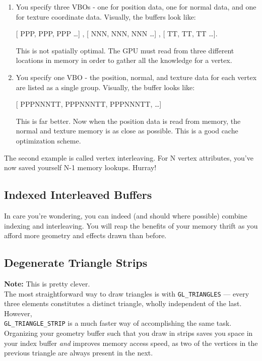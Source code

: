 \documentclass{scrartcl}
\begin{document}
\begin{enumerate}

\item You specify three VBOs - one for position data, one for normal data, and one for texture coordinate data. Visually, the buffers look like:

[ PPP, PPP, PPP \ldots ] , [ NNN, NNN, NNN \ldots ] , [ TT, TT, TT  \ldots ].

This is not spatially optimal. The GPU must read from three different locations in memory in order to gather all the knowledge for a vertex.

\item You specify one VBO - the position, normal, and texture data for each vertex are listed as a single group. Visually, the buffer looks like:

[ PPPNNNTT, PPPNNNTT, PPPNNNTT, \ldots ]

This is far better. Now when the position data is read from memory, the normal and texture memory is as close as possible. This is a good cache optimization scheme.

\end{enumerate}

The second example is called vertex interleaving. For N vertex attributes, you've now saved yourself N-1 memory lookups. Hurray!


\subsection{ Indexed Interleaved Buffers }

In care you're wondering, you can indeed (and should where possible) combine indexing and interleaving. You will reap the benefits of your memory thrift as you afford more geometry and effects drawn than before.

\subsection{ Degenerate Triangle Strips }

\textbf{Note:} This is pretty clever.\\

The most straightforward way to draw triangles is with \texttt{GL\_TRIANGLES} --- every three elements constitutes a distinct triangle, wholly independent of the last. However, \\ \texttt{GL\_TRIANGLE\_STRIP} is a much faster way of accomplishing the same task. Organizing your geometry buffer such that you draw in strips saves you space in your index buffer \textit{and} improves memory access speed, as two of the vertices in the previous triangle are always present in the next.\\
\end{document}
